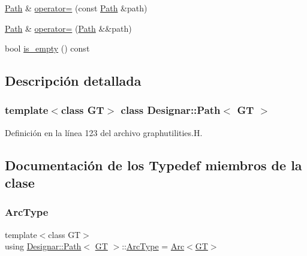\begin{DoxyCompactItemize}
\item 
\hyperlink{class_designar_1_1_path}{Path} \& \hyperlink{class_designar_1_1_path_a9b358572a872b993a4cdad651cc2bf58}{operator=} (const \hyperlink{class_designar_1_1_path}{Path} \&path)
\item 
\hyperlink{class_designar_1_1_path}{Path} \& \hyperlink{class_designar_1_1_path_af84a6745c52225e5588db4a2ed5d828e}{operator=} (\hyperlink{class_designar_1_1_path}{Path} \&\&path)
\item 
bool \hyperlink{class_designar_1_1_path_a80167d17fbc206944b05293253c95df0}{is\+\_\+empty} () const
\end{DoxyCompactItemize}


\subsection{Descripción detallada}
\subsubsection*{template$<$class GT$>$\newline
class Designar\+::\+Path$<$ G\+T $>$}



Definición en la línea 123 del archivo graphutilities.\+H.



\subsection{Documentación de los \textquotesingle{}Typedef\textquotesingle{} miembros de la clase}
\mbox{\label{class_designar_1_1_path_a6e13966351659cedcf3233098b2b7384}} 
\subsubsection{\texorpdfstring{Arc\+Type}{ArcType}}
{\footnotesize\ttfamily template$<$class GT$>$ \\
using \hyperlink{class_designar_1_1_path}{Designar\+::\+Path}$<$ \hyperlink{demo-buildgraph_8_c_a3001c40d2c31ca87ed96cd7d1334a55e}{GT} $>$\+::\hyperlink{class_designar_1_1_path_a6e13966351659cedcf3233098b2b7384}{Arc\+Type} =  \hyperlink{namespace_designar_a3f55fb5513d62ff47cbc8f72b8e95d6f}{Arc}$<$\hyperlink{demo-buildgraph_8_c_a3001c40d2c31ca87ed96cd7d1334a55e}{GT}$>$}



